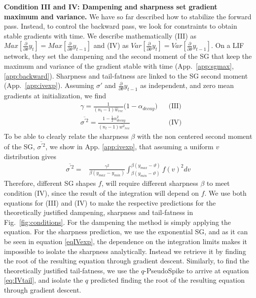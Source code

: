 \noindent\textbf{Condition III and IV: Dampening and sharpness set gradient maximum and variance.}
We have so far described how to stabilize the forward pass.
Instead, to control the backward pass, we look for constraints to obtain stable gradients with time. We describe mathematically (III) as $Max[\frac{\partial}{\partial \theta}y_t] = Max[\frac{\partial}{\partial \theta}y_{t-1}]$ and (IV) as $Var[\frac{\partial}{\partial \theta}y_t] = Var[\frac{\partial}{\partial \theta}y_{t-1}]$. On a LIF network, they set the dampening and the second moment of the SG that keep the maximum and variance of the gradient stable with time (App.~\ref{app:sgmax}, \ref{app:backward}). Sharpness and tail-fatness are linked to the SG second moment (App.~\ref{app:ivexp}). Assuming $\sigma'$ and $\frac{\partial}{\partial \theta}y_{t-1}$ as independent, and zero mean gradients at initialization, we find
{\small
\begin{align*}
    &\gamma=   \frac{1}{(n_{l}-1)\hat{w}_{rec}}\Big( 1 -\alpha_{decay} \Big)&& \text{(III)}\\
    &\overline{\sigma^{\prime 2}} = \frac{1-\frac{1}{2}\alpha_{decay}^2}{(n_{l}-1)\overline{w^2}_{rec}}  && \text{(IV)}
\end{align*}
}
To be able to clearly relate the sharpness $\beta$ with the non centered second moment of the SG, $\overline{\sigma^{\prime2}}$, we show in App. \ref{app:ivexp}, that assuming a uniform $v$ distribution gives
\begin{align}
    \label{eq:2momsigma}
    \overline{\sigma^{\prime2}}
    =&\frac{\gamma^2}{\beta(y_{max}-y_{min})}\int^{\beta(y_{max}-\vartheta)}_{\beta(y_{min}-\vartheta)} f(v)^2dv
\end{align}
Therefore, different SG  shapes $f$, will require different sharpness $\beta$ to meet condition (IV), since the result of the integration will depend on $f$. We use both equations for (III) and (IV) to make the respective predictions for the theoretically justified dampening, sharpness and tail-fatness in Fig.~\ref{fig:conditions}. For the dampening the method is simply applying the equation. For the sharpness prediction, we use the exponential SG, and as it can be seen in equation \ref{eqIVexp}, the dependence on the integration limits makes it impossible to isolate the sharpness analytically. Instead we retrieve it by finding the root of the resulting equation through gradient descent. Similarly, to find the theoretically justified tail-fatness, we use the $q$-PseudoSpike to arrive at equation \ref{eq:IVtail}, and isolate the $q$ predicted finding the root of the resulting equation through gradient descent.


